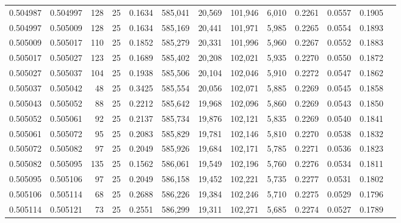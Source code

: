 \begin{tabular}{rrrrrrrrrrrrr}
0.504987 & 0.504997 & 128 &  25 &                                     0.1634 & 585,041 &  20,569 & 101,946 &   6,010 & 0.2261 & 0.0557 & 0.1905 \\
0.504997 & 0.505009 & 128 &  25 &                                     0.1634 & 585,169 &  20,441 & 101,971 &   5,985 & 0.2265 & 0.0554 & 0.1893 \\
0.505009 & 0.505017 & 110 &  25 &                                     0.1852 & 585,279 &  20,331 & 101,996 &   5,960 & 0.2267 & 0.0552 & 0.1883 \\
0.505017 & 0.505027 & 123 &  25 &                                     0.1689 & 585,402 &  20,208 & 102,021 &   5,935 & 0.2270 & 0.0550 & 0.1872 \\
0.505027 & 0.505037 & 104 &  25 &                                     0.1938 & 585,506 &  20,104 & 102,046 &   5,910 & 0.2272 & 0.0547 & 0.1862 \\
0.505037 & 0.505042 &  48 &  25 &                                     0.3425 & 585,554 &  20,056 & 102,071 &   5,885 & 0.2269 & 0.0545 & 0.1858 \\
0.505043 & 0.505052 &  88 &  25 &                                     0.2212 & 585,642 &  19,968 & 102,096 &   5,860 & 0.2269 & 0.0543 & 0.1850 \\
0.505052 & 0.505061 &  92 &  25 &                                     0.2137 & 585,734 &  19,876 & 102,121 &   5,835 & 0.2269 & 0.0540 & 0.1841 \\
0.505061 & 0.505072 &  95 &  25 &                                     0.2083 & 585,829 &  19,781 & 102,146 &   5,810 & 0.2270 & 0.0538 & 0.1832 \\
0.505072 & 0.505082 &  97 &  25 &                                     0.2049 & 585,926 &  19,684 & 102,171 &   5,785 & 0.2271 & 0.0536 & 0.1823 \\
0.505082 & 0.505095 & 135 &  25 &                                     0.1562 & 586,061 &  19,549 & 102,196 &   5,760 & 0.2276 & 0.0534 & 0.1811 \\
0.505095 & 0.505106 &  97 &  25 &                                     0.2049 & 586,158 &  19,452 & 102,221 &   5,735 & 0.2277 & 0.0531 & 0.1802 \\
0.505106 & 0.505114 &  68 &  25 &                                     0.2688 & 586,226 &  19,384 & 102,246 &   5,710 & 0.2275 & 0.0529 & 0.1796 \\
0.505114 & 0.505121 &  73 &  25 &                                     0.2551 & 586,299 &  19,311 & 102,271 &   5,685 & 0.2274 & 0.0527 & 0.1789 \\

\end{tabular}
